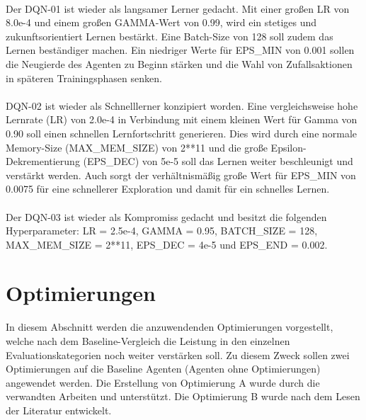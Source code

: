 \\Der DQN-01 ist wieder als langsamer Lerner gedacht. Mit einer großen LR von 8.0e-4 und einem großen GAMMA-Wert von 0.99, wird ein stetiges und zukunftsorientiert Lernen bestärkt. Eine Batch-Size von 128 soll zudem das Lernen beständiger machen. Ein niedriger Werte für EPS\_MIN von 0.001 sollen die Neugierde des Agenten zu Beginn stärken und die Wahl von Zufallsaktionen in späteren Trainingsphasen senken.\\
\\DQN-02 ist wieder als Schnelllerner konzipiert worden. Eine vergleichsweise hohe Lernrate (LR) von 2.0e-4 in Verbindung mit einem kleinen Wert für Gamma von 0.90 soll einen schnellen Lernfortschritt generieren. Dies wird durch eine normale Memory-Size (MAX\_MEM\_SIZE) von 2**11 und die große Epsilon-Dekrementierung (EPS\_DEC) von 5e-5 soll das Lernen weiter beschleunigt und verstärkt werden. Auch sorgt der verhältnismäßig große Wert für EPS\_MIN von 0.0075 für eine schnellerer Exploration und damit für ein schnelles Lernen.\\
\\Der DQN-03 ist wieder als Kompromiss gedacht und besitzt die folgenden Hyperparameter: 
LR = 2.5e-4, GAMMA = 0.95, BATCH\_SIZE = 128, 
MAX\_MEM\_SIZE = 2**11, EPS\_DEC = 4e-5 und EPS\_END = 0.002.

\section{Optimierungen}
In diesem Abschnitt werden die anzuwendenden Optimierungen vorgestellt, welche nach dem Baseline-Vergleich die Leistung in den einzelnen Evaluationskategorien noch weiter verstärken soll. Zu diesem Zweck sollen zwei Optimierungen auf die Baseline Agenten (Agenten ohne Optimierungen) angewendet werden. Die Erstellung von Optimierung A wurde durch die verwandten Arbeiten \cite{UAV} und \cite{Autonomous_Agents_in_Snake_Game_via_DRL} unterstützt. Die Optimierung B wurde nach dem Lesen der Literatur \cite[S. 331 f.]{DRL_Lapan} entwickelt.\\

